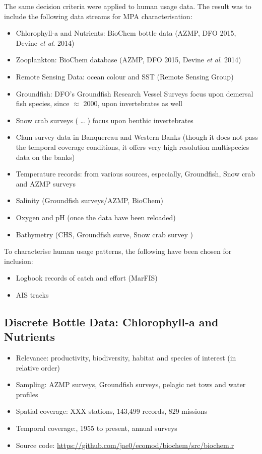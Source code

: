\documentclass[letterpaper,portrait,11pt]{scrartcl}
\numberwithin{equation}{section}		%
\numberwithin{figure}{section}			%
\numberwithin{table}{section}				%
\begin{document}
The same decision criteria were applied to human usage data. The result was to include the following data streams for MPA characterisation:

\begin{itemize}
	\item Chlorophyll-a and Nutrients: BioChem bottle data (AZMP, DFO 2015, Devine \textit{et al}. 2014) 
  \item Zooplankton: BioChem database (AZMP, DFO 2015, Devine \textit{et al}. 2014) 
  \item Remote Sensing Data: ocean colour and SST (Remote Sensing Group)
  \item Groundfish: DFO's Groundfish Research Vessel Surveys focus upon demersal fish species, since $\approx$ 2000, upon invertebrates as well
  \item Snow crab surveys ( \ldots{} ) focus upon benthic invertebrates
  \item Clam survey data in Banquereau and Western Banks (though it does not pass the temporal coverage conditions, it offers very high resolution multispecies data on the banks)
  \item Temperature records: from various sources, especially, Groundfish, Snow crab and AZMP surveys
  \item Salinity (Groundfish surveys/AZMP, BioChem)
  \item Oxygen and pH (once the data have been reloaded)
  \item Bathymetry (CHS, Groundfish surve, Snow crab survey )
\end{itemize}

To characterise human usage patterns, the following have been chosen for inclusion:

\begin{itemize}
	\item Logbook records of catch and effort (MarFIS)
  \item AIS tracks
\end{itemize}

\subsection{Discrete Bottle Data: Chlorophyll-a and Nutrients}

\begin{itemize}
  \item Relevance:  productivity, biodiversity, habitat and species of interest (in relative order)
  \item Sampling:  AZMP surveys, Groundfish surveys, pelagic net tows and water profiles
  \item Spatial coverage: XXX stations, 143,499 records, 829 missions
  \item Temporal coverage:,  1955 to present, annual surveys
  \item Source code: \url{https://github.com/jae0/ecomod/biochem/src/biochem.r}
\end{itemize}
\end{document}
